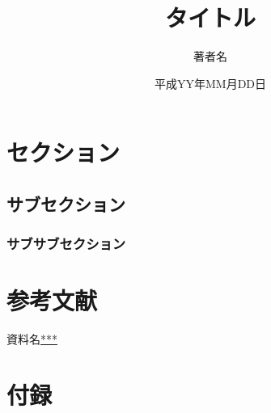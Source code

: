 \documentclass{jsarticle}
\begin{document}
\title{タイトル}
\author{著者名}
\date{平成YY年MM月DD日}
\maketitle
\section{セクション}
\subsection{サブセクション}
\subsubsection{サブサブセクション}
\section{参考文献}
\begin{thebibliography}{99}
資料名\url{***}
\end{thebibliography}
\section{付録}

\end{document}
